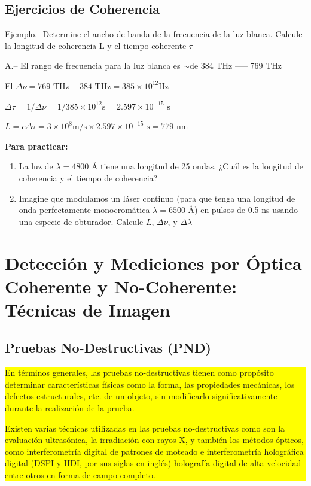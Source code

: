 \documentclass[12pt]{article}
\begin{document}
	\subsection{Ejercicios de Coherencia}
	Ejemplo.- Determine el ancho de banda de la frecuencia de la luz blanca. Calcule la longitud de coherencia L y el tiempo coherente $\tau$
	
	A.– El rango de frecuencia para la luz blanca es $\sim$de 384 THz ----- 769 THz
	
	El $\Delta \nu = 769 \text{ THz} - 384 \text{ THz} = 385 \times 10^{12} \text{Hz}$
	
	$\Delta \tau = 1/\Delta \nu = 1/385 \times 10^{12} \text{s} = 2.597 \times 10^{-15} \text{ s}$
	
	$L = c \Delta \tau = 3 \times 10^8 \text{m/s} \times 2.597 \times 10^{-15} \text{ s} = 779 \text{ nm}$
	
	\textbf{Para practicar:}
	\begin{enumerate}
		\item La luz de $\lambda = 4800 \text{ \AA}$ tiene una longitud de 25 ondas. ¿Cuál es la longitud de coherencia y el tiempo de coherencia?
		\item Imagine que modulamos un láser continuo (para que tenga una longitud de onda perfectamente monocromática $\lambda = 6500 \text{ \AA}$) en pulsos de 0.5 ns usando una especie de obturador. Calcule $L$, $\Delta \nu$, y $\Delta \lambda$
	\end{enumerate}
	
	\section{Detección y Mediciones por Óptica Coherente y No-Coherente: Técnicas de Imagen}
	
	\subsection{Pruebas No-Destructivas (PND)}
	\colorbox{yellow}{\parbox{\textwidth}{
			En términos generales, las pruebas no-destructivas tienen como propósito determinar características físicas como la forma, las propiedades mecánicas, los defectos estructurales, etc. de un objeto, sin modificarlo significativamente durante la realización de la prueba.
			
			Existen varias técnicas utilizadas en las pruebas no-destructivas como son la evaluación ultrasónica, la irradiación con rayos X, y también los métodos ópticos, como interferometría digital de patrones de moteado e interferometría holográfica digital (DSPI y HDI, por sus siglas en inglés) holografía digital de alta velocidad entre otros en forma de campo completo.
	}}
	
\end{document}
